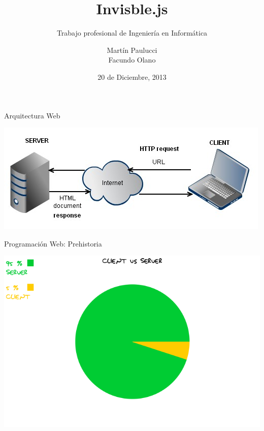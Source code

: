 \documentclass[xcolor=dvipsnames, 14pt]{beamer}
\title{Invisble.js}
\subtitle{Trabajo profesional de Ingeniería en Informática}
\author{
Martín Paulucci \\
Facundo Olano
}
\institute[UMBC]{
  Facultad de Ingeniería\\
  Universidad de Buenos Aires \\
}
\date{20 de Diciembre, 2013}
\begin{document}
\begin{frame}[plain]
  \titlepage
\end{frame}

\begin{frame}{Arquitectura Web}
    \begin{center}
        \includegraphics[width=\textwidth]{img/http.png}
    \end{center}
\end{frame}

\begin{frame}{Programación Web: Prehistoria}
    \begin{center}
        \includegraphics[width=\textwidth]{img/prehistoria.png}
    \end{center}
\end{frame}
\end{document}
